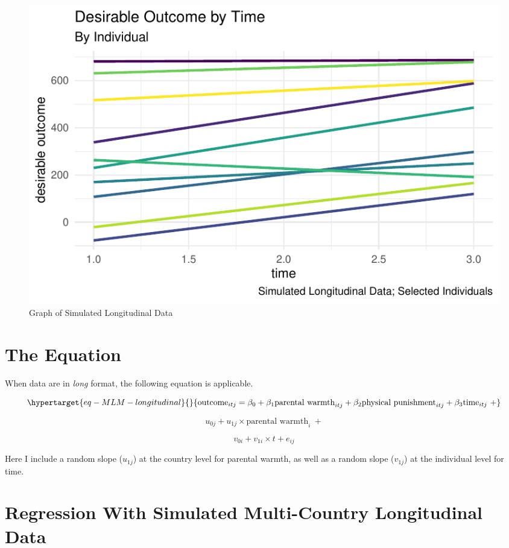\documentclass[
  letterpaper,
  DIV=11,
  numbers=noendperiod]{scrreprt}
\begin{document}
\begin{figure}[H]

{\centering \includegraphics{./longitudinal_files/figure-pdf/fig-data2-1.pdf}

}

\caption{\label{fig-data2}Graph of Simulated Longitudinal Data}

\end{figure}

\hypertarget{the-equation-1}{%
\section{The Equation}\label{the-equation-1}}

When data are in \emph{long} format, the following equation is
applicable.

\begin{equation}\protect\hypertarget{eq-MLM-longitudinal}{}{\text{outcome}_{itj} = \beta_0 + \beta_1 \text{parental warmth}_{itj} + \beta_2 \text{physical punishment}_{itj} + \beta_3 \text{time}_{itj} \ + }\label{eq-MLM-longitudinal}\end{equation}

\[u_{0j} + u_{1j} \times \text{parental warmth}_i \ + \]

\[v_{0i} + v_{1i} \times t + e_{ij}\]

Here I include a random slope (\(u_{1j}\)) at the country level for
parental warmth, as well as a random slope (\(v_{1j}\)) at the
individual level for time.

\hypertarget{sec-regressionlongitudinal}{%
\section{Regression With Simulated Multi-Country Longitudinal
Data}\label{sec-regressionlongitudinal}}
\end{document}
